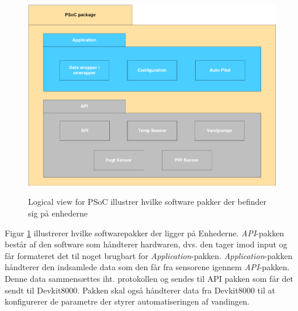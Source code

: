 \newenvironment{figure1}[1][]{\begin{figure}[#1]\vspace{3.0cm}}{\vspace{1.0cm}\end{figure}}
\begin{figure1}[htbp] \centering
{\includegraphics[scale=0.7]{filer/systemarkitektur/logical_view_psoc}}
\caption{Logical view for PSoC illustrer hvilke software pakker der befinder sig på enhederne}
\label{fig:Logical View PSoC}
\end{figure1}

Figur \ref{fig:Logical View PSoC} illustrerer hvilke softwarepakker der ligger på Enhederne. \textit{API}-pakken består af den software som håndterer hardwaren, dvs. den tager imod input og får formateret det til noget brugbart for \textit{Application}-pakken. \textit{Application}-pakken håndterer den indsamlede data som den får fra sensorene igennem \textit{API}-pakken. Denne data sammensættes iht. protokollen og sendes til API pakken som får det sendt til Devkit8000. Pakken skal også håndterer data fra Devkit8000 til at konfigurerer de parametre der styrer automatiseringen af vandingen.

